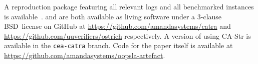 A reproduction package featuring all relevant logs and all benchmarked instances is available~\cite{artefact}.
\Catra{} and \Ostrich{} are both available as living software
under a 3-clause BSD~license on GitHub at \url{https://github.com/amandasystems/catra} and \url{https://github.com/uuverifiers/ostrich}
respectively. A version of \Ostrich{} using CA-Str is available in the \texttt{cea-catra} branch. Code for the paper itself
is available at \url{https://github.com/amandasystems/oopsla-artefact}.